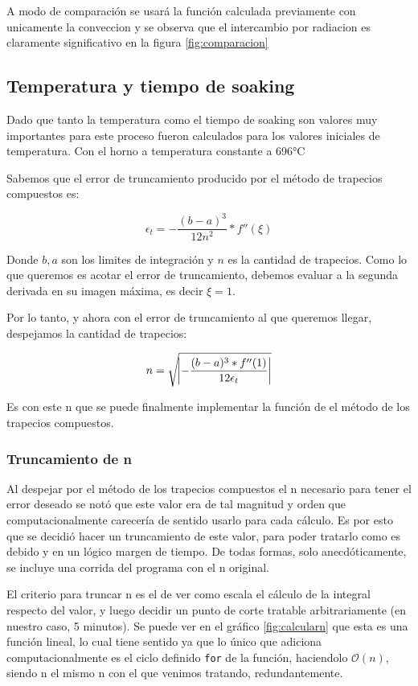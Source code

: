 \documentclass[11pt,a4paper]{article}
\begin{document}
A modo de comparación se usará la función calculada previamente con unicamente la conveccion y se observa que el intercambio por radiacion es claramente significativo en la figura \ref{fig:comparacion}

\subsection{Temperatura y tiempo de soaking}

Dado que tanto la temperatura como el tiempo de soaking son valores muy importantes para este proceso fueron calculados para los valores iniciales de temperatura. Con el horno a temperatura constante a 696°C

Sabemos que el error de truncamiento producido por el método de trapecios compuestos es:

\begin{equation}
    \epsilon_t = - \frac{{(b - a)}^3}{12 n^2} * f''(\xi)
\end{equation}
    
Donde \(b, a\) son los limites de integración y \(n\) es la cantidad de trapecios. Como lo que queremos es acotar el error de truncamiento, debemos evaluar a la segunda derivada en su imagen máxima, es decir \(\xi = 1 \).

Por lo tanto, y ahora con el error de truncamiento al que queremos llegar, despejamos la cantidad de trapecios:

\begin{equation}
    n  = \sqrt{ \abs{ - \frac{(b - a)^3 * f''(1)}{12 \epsilon_t}}} 
\end{equation}


Es con este n que se puede finalmente implementar la función de el método de los trapecios compuestos.

\subsubsection{Truncamiento de n}

Al despejar por el método de los trapecios compuestos el n necesario para tener el error deseado se notó que este valor era de tal magnitud y orden que computacionalmente carecería de sentido usarlo para cada cálculo. Es por esto que se decidió hacer un truncamiento de este valor, para poder tratarlo como es debido y en un lógico margen de tiempo. De todas formas, solo anecdóticamente, se incluye una corrida del programa con el n original.

El criterio para truncar n es el de ver como escala el cálculo de la integral respecto del valor, y luego decidir un punto de corte tratable arbitrariamente (en nuestro caso, 5 minutos). Se puede ver en el gráfico \ref{fig:calcularn} que esta es una función lineal, lo cual tiene sentido ya que lo único que adiciona computacionalmente es el ciclo definido \texttt{for} de la función, haciendolo \(\mathcal{O}(n)\), siendo n el mismo n con el que venimos tratando, redundantemente.
\end{document}
